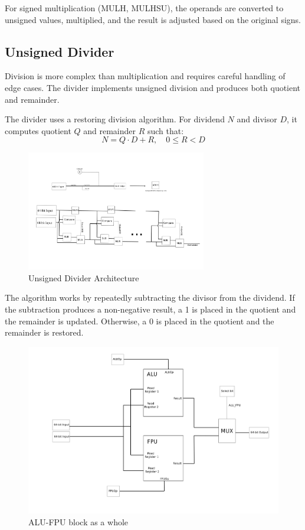 \documentclass{article}
\begin{document}
For signed multiplication (MULH, MULHSU), the operands are converted to unsigned values, multiplied, and the result is adjusted based on the original signs.

\subsection*{Unsigned Divider}

Division is more complex than multiplication and requires careful handling of edge cases. The divider implements unsigned division and produces both quotient and remainder.

The divider uses a restoring division algorithm. For dividend \(N\) and divisor \(D\), it computes quotient \(Q\) and remainder \(R\) such that:
\[
N = Q \cdot D + R, \quad 0 \leq R < D
\]

\begin{figure}[H]
    \centering
    \includegraphics[width=0.7\textwidth]{Unsigned_divider.png}
    \caption{Unsigned Divider Architecture}
    \label{fig:divider}
\end{figure}

The algorithm works by repeatedly subtracting the divisor from the dividend. If the subtraction produces a non-negative result, a 1 is placed in the quotient and the remainder is updated. Otherwise, a 0 is placed in the quotient and the remainder is restored.

\begin{figure}
    \centering
    \includegraphics[width=0.7\linewidth]{ALU_FPUblock.png}
    \caption{ALU-FPU block as a whole}
    \label{fig:placeholder}
\end{figure}
\end{document}
